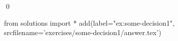 
\begin{ex} 
  \label{ex:some-decision1}
  
  \qed
\end{ex} 
\begin{python0}
from solutions import *
add(label="ex:some-decision1",
    srcfilename='exercises/some-decision1/answer.tex') 
\end{python0}
